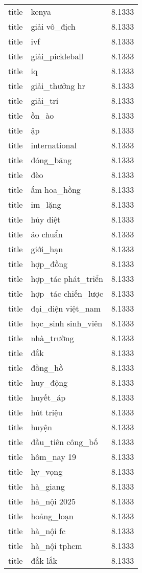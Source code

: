 \documentclass{article}
\begin{document}
\begin{tabular}{lll}
title & kenya & 8.1333\\
title & giải vô\_địch & 8.1333\\
title & ivf & 8.1333\\
title & giải\_pickleball & 8.1333\\
title & iq & 8.1333\\
title & giải\_thưởng hr & 8.1333\\
title & giải\_trí & 8.1333\\
title & ồn\_ào & 8.1333\\
title & ập & 8.1333\\
title & international & 8.1333\\
title & đóng\_băng & 8.1333\\
title & đèo & 8.1333\\
title & ấm hoa\_hồng & 8.1333\\
title & im\_lặng & 8.1333\\
title & hủy diệt & 8.1333\\
title & ảo chuẩn & 8.1333\\
title & giới\_hạn & 8.1333\\
title & hợp\_đồng & 8.1333\\
title & hợp\_tác phát\_triển & 8.1333\\
title & hợp\_tác chiến\_lược & 8.1333\\
title & đại\_diện việt\_nam & 8.1333\\
title & học\_sinh sinh\_viên & 8.1333\\
title & nhà\_trường & 8.1333\\
title & đắk & 8.1333\\
title & đồng\_hồ & 8.1333\\
title & huy\_động & 8.1333\\
title & huyết\_áp & 8.1333\\
title & hút triệu & 8.1333\\
title & huyện & 8.1333\\
title & đầu\_tiên công\_bố & 8.1333\\
title & hôm\_nay 19 & 8.1333\\
title & hy\_vọng & 8.1333\\
title & hà\_giang & 8.1333\\
title & hà\_nội 2025 & 8.1333\\
title & hoảng\_loạn & 8.1333\\
title & hà\_nội fc & 8.1333\\
title & hà\_nội tphcm & 8.1333\\
title & đắk lắk & 8.1333\\

\end{tabular}
\end{document}
